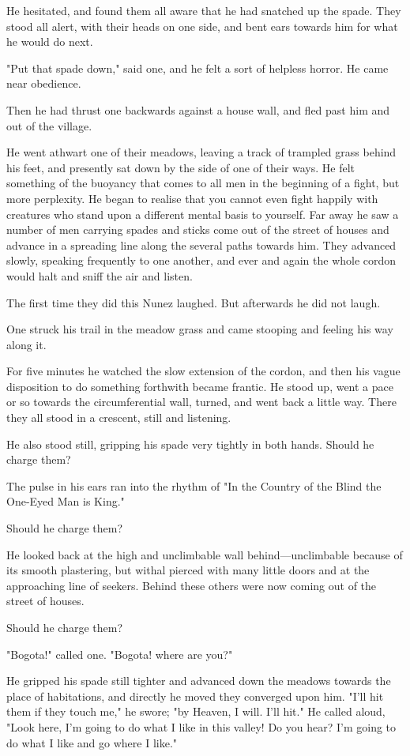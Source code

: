 \documentclass[submission]{sffms}
\begin{document}
He hesitated, and found them all aware that he had snatched up the
spade. They stood all alert, with their heads on one side, and bent
ears towards him for what he would do next.

"Put that spade down," said one, and he felt a sort of helpless
horror. He came near obedience.

Then he had thrust one backwards against a house wall, and fled past
him and out of the village.

He went athwart one of their meadows, leaving a track of trampled
grass behind his feet, and presently sat down by the side of one of
their ways. He felt something of the buoyancy that comes to all men in
the beginning of a fight, but more perplexity. He began to realise
that you cannot even fight happily with creatures who stand upon a
different mental basis to yourself. Far away he saw a number of men
carrying spades and sticks come out of the street of houses and
advance in a spreading line along the several paths towards him. They
advanced slowly, speaking frequently to one another, and ever and
again the whole cordon would halt and sniff the air and listen.

The first time they did this Nunez laughed. But afterwards he did not
laugh.

One struck his trail in the meadow grass and came stooping and feeling
his way along it.

For five minutes he watched the slow extension of the cordon, and then
his vague disposition to do something forthwith became frantic. He
stood up, went a pace or so towards the circumferential wall, turned,
and went back a little way.  There they all stood in a crescent, still
and listening.

He also stood still, gripping his spade very tightly in both
hands. Should he charge them?

The pulse in his ears ran into the rhythm of "In the Country of the
Blind the One-Eyed Man is King."

Should he charge them?

He looked back at the high and unclimbable wall behind---unclimbable
because of its smooth plastering, but withal pierced with many little
doors and at the approaching line of seekers. Behind these others were
now coming out of the street of houses.

Should he charge them?

"Bogota!" called one. "Bogota! where are you?"

He gripped his spade still tighter and advanced down the meadows
towards the place of habitations, and directly he moved they converged
upon him. "I'll hit them if they touch me," he swore; "by Heaven, I
will. I'll hit." He called aloud, "Look here, I'm going to do what I
like in this valley! Do you hear? I'm going to do what I like and go
where I like."
\end{document}
